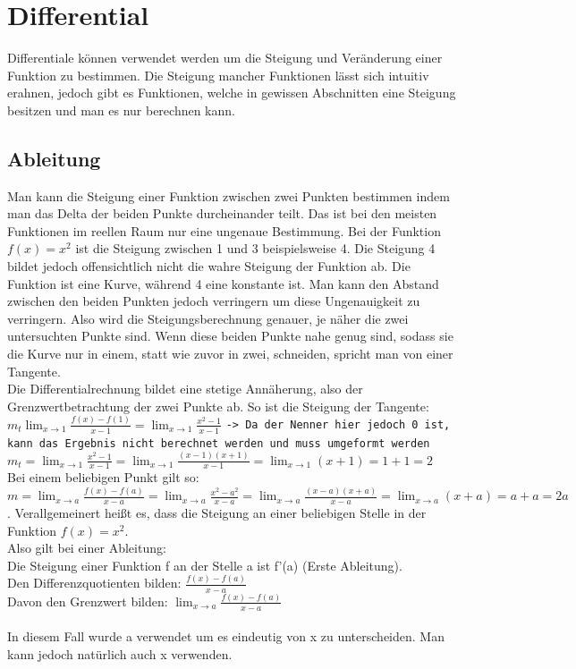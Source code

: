 \documentclass{article}
\begin{document}
	\section{Differential}
	Differentiale können verwendet werden um die Steigung und Veränderung einer Funktion zu bestimmen. Die Steigung mancher Funktionen lässt sich intuitiv erahnen, jedoch gibt es Funktionen, welche in gewissen Abschnitten eine Steigung besitzen und man es nur berechnen kann.
	\subsection{Ableitung}
	Man kann die Steigung einer Funktion zwischen zwei Punkten bestimmen indem man das Delta der beiden Punkte durcheinander teilt. Das ist bei den meisten Funktionen im reellen Raum nur eine ungenaue Bestimmung. Bei der Funktion $f(x)=x^2$ ist die Steigung zwischen 1 und 3 beispielsweise 4. Die Steigung 4 bildet jedoch offensichtlich nicht die wahre Steigung der Funktion ab. Die Funktion ist eine Kurve, während 4 eine konstante ist. Man kann den Abstand zwischen den beiden Punkten jedoch verringern um diese Ungenauigkeit zu verringern. Also wird die Steigungsberechnung genauer, je näher die zwei untersuchten Punkte sind. Wenn diese beiden Punkte nahe genug sind, sodass sie die Kurve nur in einem, statt wie zuvor in zwei, schneiden, spricht man von einer Tangente.\\
	Die Differentialrechnung bildet eine stetige Annäherung, also der Grenzwertbetrachtung der zwei Punkte ab. So ist die Steigung der Tangente: $m_t\lim_{x\to 1}\frac{f(x)-f(1)}{x-1}=\lim_{x\to 1}\frac{x^2-1}{x-1}$ \verb|-> Da der Nenner hier jedoch 0 ist, kann das Ergebnis nicht berechnet werden und muss umgeformt werden| \\
	$m_t=\lim_{x\to 1}\frac{x^2-1}{x-1}=\lim_{x\to 1}\frac{(x-1)(x+1)}{x-1}=\lim_{x\to 1}(x+1)=1+1=2$ \\
	Bei einem beliebigen Punkt gilt so: $m=\lim_{x\to a}\frac{f(x)-f(a)}{x-a}=\lim_{x\to a}\frac{x^2-a^2}{x-a}=\lim_{x\to a}\frac{(x-a)(x+a)}{x-a}=\lim_{x\to a}(x+a)=a+a=2a$. Verallgemeinert heißt es, dass die Steigung an einer beliebigen Stelle in der Funktion $f(x)=x^2$. \\
	Also gilt bei einer Ableitung: \\
	Die Steigung einer Funktion f an der Stelle a ist f'(a) (Erste Ableitung). \\
	Den Differenzquotienten bilden: $\frac{f(x)-f(a)}{x-a}$ \\
	Davon den Grenzwert bilden: $\lim_{x\to a}\frac{f(x)-f(a)}{x-a}$ \\
	\\
	In diesem Fall wurde a verwendet um es eindeutig von x zu unterscheiden. Man kann jedoch natürlich auch x verwenden.
\end{document}

